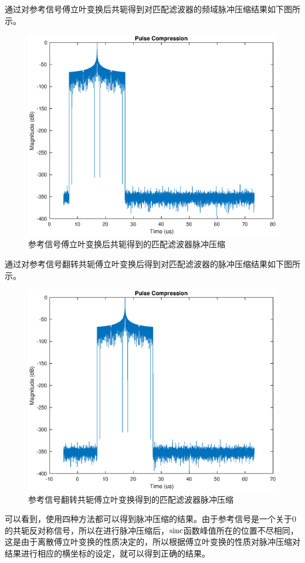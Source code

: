 通过对参考信号傅立叶变换后共轭得到对匹配滤波器的频域脉冲压缩结果如下图所示。
\begin{figure}[H]
	\centering
	\includegraphics[width=0.7\linewidth]{figure/FFTConjuagePulseCompression.eps}
	\caption{参考信号傅立叶变换后共轭得到的匹配滤波器脉冲压缩}
\end{figure}
通过对参考信号翻转共轭傅立叶变换后得到对匹配滤波器的脉冲压缩结果如下图所示。
\begin{figure}[H]
	\centering
	\includegraphics[width=0.7\linewidth]{figure/FilpConjugateFFTPulseCompression.eps}
	\caption{参考信号翻转共轭傅立叶变换得到的匹配滤波器脉冲压缩}
\end{figure}
可以看到，使用四种方法都可以得到脉冲压缩的结果。由于参考信号是一个关于0的共轭反对称信号，所以在进行脉冲压缩后，$\mathrm{sinc}$函数峰值所在的位置不尽相同，这是由于离散傅立叶变换的性质决定的，所以根据傅立叶变换的性质对脉冲压缩对结果进行相应的横坐标的设定，就可以得到正确的结果。